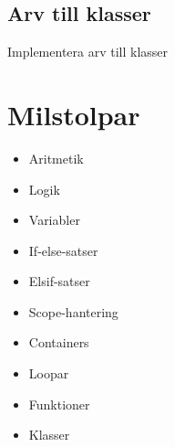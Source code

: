 \documentclass{TDP003mall}
\begin{document}
    \subsection{Arv till klasser}
    Implementera arv till klasser
    
    
    \section{Milstolpar}
    \begin{itemize}
    \item Aritmetik
    \item Logik
    \item Variabler
    \item If-else-satser
    \item Elsif-satser
    \item Scope-hantering
    \item Containers
    \item Loopar
    \item Funktioner
    \item Klasser
    \end{itemize}
\end{document}
